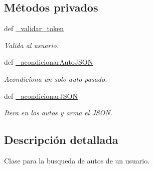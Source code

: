 \subsection*{Métodos privados}
\begin{DoxyCompactItemize}
\item 
def \hyperlink{classsrc_1_1resources_1_1autos_por_usuario_1_1_autos_por_usuario_adec61b4d99af1d8a37538e36572a047f}{\-\_\-validar\-\_\-token}
\begin{DoxyCompactList}\small\item\em Valida al usuario. \end{DoxyCompactList}\item 
def \hyperlink{classsrc_1_1resources_1_1autos_por_usuario_1_1_autos_por_usuario_ab536a2b91c380db5d95b8f88857fa4f4}{\-\_\-acondicionar\-Auto\-J\-S\-O\-N}
\begin{DoxyCompactList}\small\item\em Acondiciona un solo auto pasado. \end{DoxyCompactList}\item 
def \hyperlink{classsrc_1_1resources_1_1autos_por_usuario_1_1_autos_por_usuario_a31c3ea98b38c88058e0036d95d06bd8c}{\-\_\-acondicionar\-J\-S\-O\-N}
\begin{DoxyCompactList}\small\item\em Itera en los autos y arma el J\-S\-O\-N. \end{DoxyCompactList}\end{DoxyCompactItemize}


\subsection{Descripción detallada}
Clase para la busqueda de autos de un usuario. 



